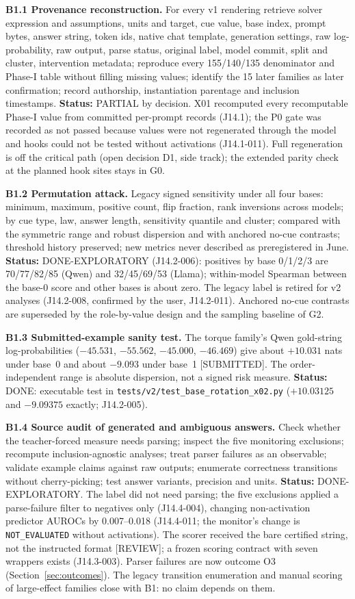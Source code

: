 \documentclass[10pt,a4paper]{article}
\newcommand{\tg}[1]{\textsc{[#1]}}
\newcommand{\NE}{\texttt{NOT\_EVALUATED}}
\begin{document}
\textbf{B1.1 Provenance reconstruction.} For every v1 rendering retrieve solver expression and assumptions, units
and target, cue value, base index, prompt bytes, answer string, token ids, native chat template, generation
settings, raw log-probability, raw output, parse status, original label, model commit, split and cluster,
intervention metadata; reproduce every 155/140/135 denominator and Phase-I table without filling missing values;
identify the 15 later families as later confirmation; record authorship, instantiation parentage and inclusion
timestamps. \textbf{Status:} PARTIAL by decision. X01 recomputed every recomputable Phase-I value from committed
per-prompt records (J14.1); the P0 gate was recorded as not passed because values were not regenerated through
the model and hooks could not be tested without activations (J14.1-011). Full regeneration is off the critical
path (open decision D1, side track); the extended parity check at the planned hook sites stays in G0.

\textbf{B1.2 Permutation attack.} Legacy signed sensitivity under all four bases: minimum, maximum, positive count,
flip fraction, rank inversions across models; by cue type, law, answer length, sensitivity quantile and cluster;
compared with the symmetric range and robust dispersion and with anchored no-cue contrasts; threshold history
preserved; new metrics never described as preregistered in June. \textbf{Status:} DONE-EXPLORATORY (J14.2-006):
positives by base 0/1/2/3 are 70/77/82/85 (Qwen) and 32/45/69/53 (Llama); within-model Spearman between the base-0
score and other bases is about zero. The legacy label is retired for v2 analyses (J14.2-008, confirmed by the
user, J14.2-011). Anchored no-cue contrasts are superseded by the role-by-value design and the sampling baseline
of G2.

\textbf{B1.3 Submitted-example sanity test.} The torque family's Qwen gold-string log-probabilities
($-45.531$, $-55.562$, $-45.000$, $-46.469$) give about $+10.031$ nats under base~0 and about $-9.093$ under
base~1 \tg{SUBMITTED}. The order-independent range is absolute dispersion, not a signed risk measure.
\textbf{Status:} DONE: executable test in \texttt{tests/v2/test\_base\_rotation\_x02.py} ($+10.03125$ and
$-9.09375$ exactly; J14.2-005).

\textbf{B1.4 Source audit of generated and ambiguous answers.} Check whether the teacher-forced measure needs
parsing; inspect the five monitoring exclusions; recompute inclusion-agnostic analyses; treat parser failures as
an observable; validate example claims against raw outputs; enumerate correctness transitions without
cherry-picking; test answer variants, precision and units. \textbf{Status:} DONE-EXPLORATORY. The label did not
need parsing; the five exclusions applied a parse-failure filter to negatives only (J14.4-004), changing
non-activation predictor AUROCs by 0.007--0.018 (J14.4-011; the monitor's change is \NE{} without activations).
The scorer received the bare certified string, not the instructed format \tg{REVIEW}; a frozen scoring contract
with seven wrappers exists (J14.3-003). Parser failures are now outcome O3 (Section~\ref{sec:outcomes}). The
legacy transition enumeration and manual scoring of large-effect families close with B1: no claim depends on them.
\end{document}
